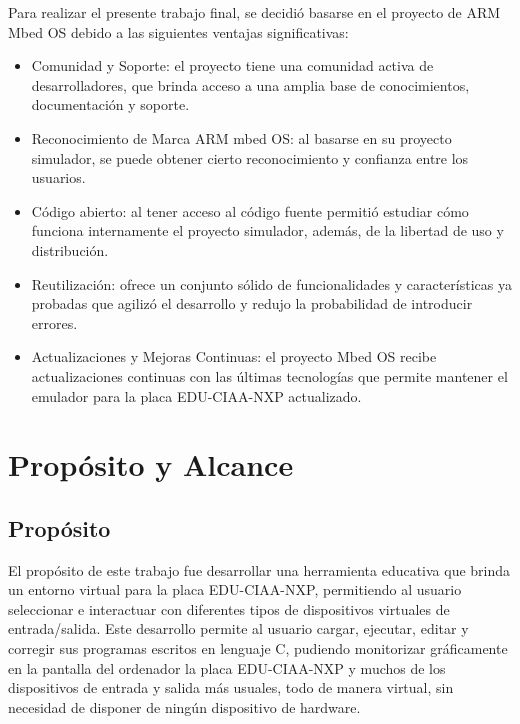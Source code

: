 Para realizar el presente trabajo final, se decidió basarse en el proyecto de ARM Mbed OS debido a las siguientes ventajas significativas:

\begin{itemize}
	\item Comunidad y Soporte: el proyecto tiene una comunidad activa de desarrolladores, que brinda acceso a una amplia base de conocimientos, documentación y soporte. 
	\item Reconocimiento de Marca ARM mbed OS: al basarse en su proyecto simulador, se puede obtener cierto reconocimiento y confianza entre los usuarios.
	\item Código abierto: al tener acceso al código fuente permitió estudiar cómo funciona internamente el proyecto simulador, además, de la libertad de uso y distribución.
	\item Reutilización: ofrece un conjunto sólido de funcionalidades y características ya probadas que agilizó el desarrollo y redujo la probabilidad de introducir errores.
	\item Actualizaciones y Mejoras Continuas: el proyecto Mbed OS recibe actualizaciones continuas con las últimas tecnologías que permite mantener el emulador para la placa EDU-CIAA-NXP actualizado.
	
\end{itemize}




\section{Propósito y Alcance}

\subsection{Propósito}

El propósito de este trabajo fue desarrollar una herramienta educativa que brinda un entorno virtual para la placa EDU-CIAA-NXP, permitiendo al usuario seleccionar e interactuar con diferentes tipos de dispositivos virtuales de entrada/salida. Este desarrollo permite al usuario cargar,
ejecutar, editar y corregir sus programas escritos en lenguaje C, pudiendo monitorizar gráficamente en la pantalla del ordenador la placa EDU-CIAA-NXP y muchos de los dispositivos de entrada y salida más usuales, todo de manera virtual, sin necesidad de disponer de ningún dispositivo de hardware.

